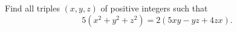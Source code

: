 Find all triples $(x,y,z)$ of positive integers such that
\[
5\left(x^2+y^2+z^2\right)=2\left(5xy-yz+4zx\right).
\]
